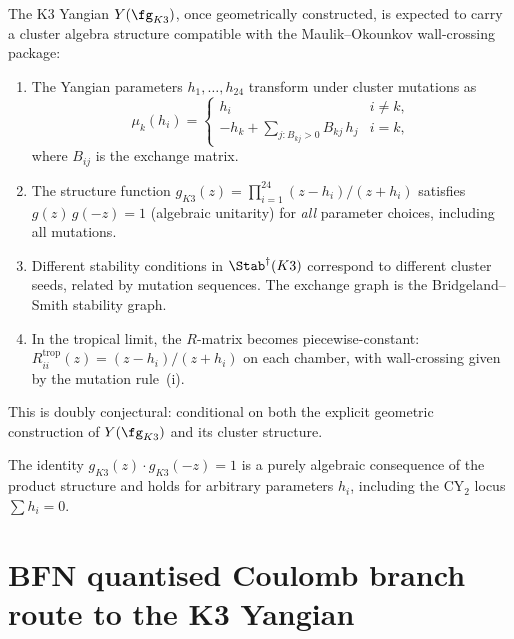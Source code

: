 \begin{conjecture}
\label{conj:cluster-yangian}
\ClaimStatusConjectured
The K3 Yangian \(Y(\fg_{K3})\), once geometrically constructed, is
expected to carry a cluster algebra structure compatible with the
Maulik--Okounkov wall-crossing package:
\begin{enumerate}[label=\textup{(\roman*)}]
\item The Yangian parameters $h_1, \ldots, h_{24}$ transform under cluster mutations as
\[
 \mu_k(h_i) = \begin{cases} h_i & i \neq k, \\ -h_k + \displaystyle\sum_{j \colon B_{kj} > 0} B_{kj}\,h_j & i = k, \end{cases}
\]
where $B_{ij}$ is the exchange matrix.
\item The structure function $g_{K3}(z) = \prod_{i=1}^{24}(z - h_i)/(z + h_i)$ satisfies $g(z)\,g(-z) = 1$ \textup{(}algebraic unitarity\textup{)} for \emph{all} parameter choices, including all mutations.
\item Different stability conditions in $\Stab^\dagger(K3)$ correspond to different cluster seeds, related by mutation sequences. The exchange graph is the Bridgeland--Smith stability graph.
\item In the tropical limit, the $R$-matrix becomes piecewise-constant: $R^{\mathrm{trop}}_{ii}(z) = (z - h_i)/(z + h_i)$ on each chamber, with wall-crossing given by the mutation rule~\textup{(i)}.
\end{enumerate}
This is doubly conjectural: conditional on both the explicit geometric
construction of \(Y(\fg_{K3})\) and its cluster structure.
\end{conjecture}

\begin{remark}
\label{rem:tropical-unitarity}
The identity $g_{K3}(z) \cdot g_{K3}(-z) = 1$ is a purely algebraic consequence of the product structure and holds for arbitrary parameters $h_i$, including the CY$_2$ locus $\sum h_i = 0$.
\end{remark}



\section{BFN quantised Coulomb branch route to the K3 Yangian}
\label{sec:bfn-coulomb-k3}

